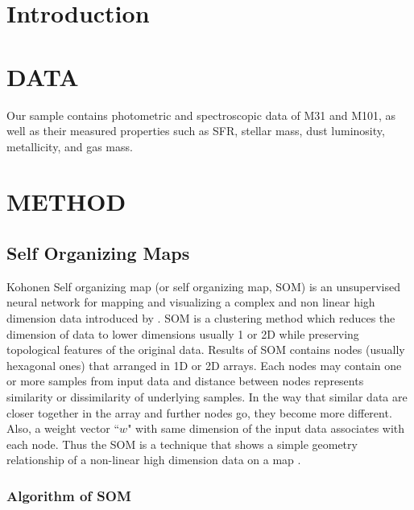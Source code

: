 \documentclass[useAMS,usenatbib]{mn2e}
\begin{document}
\section{Introduction}






\section{DATA}
Our sample contains photometric and spectroscopic data of M31 and M101, as well as their measured properties such as SFR, stellar mass, dust luminosity, metallicity, and gas mass.   



\section{METHOD}
 \subsection{Self Organizing Maps}
 
 Kohonen Self organizing map (or self organizing map, SOM) is an unsupervised neural network for mapping and visualizing a complex and non linear high dimension data introduced by \citep{Kohonen82}. 
 SOM is a clustering method which reduces the dimension of data to lower dimensions usually 1 or 2D while preserving topological features of the original data.
 Results of SOM contains nodes (usually hexagonal ones) that arranged in 1D or 2D arrays.
 Each nodes may contain one or more samples from input data and distance between nodes represents similarity or dissimilarity of underlying samples. 
 In the way that similar data are closer together in the array and further nodes go, they become more different.
 Also, a weight vector ``$w$" with same dimension of the input data associates with each node.
 Thus the SOM is a technique that shows a simple geometry relationship of a non-linear high dimension data on a map \citep{Kohonen98}. 
   \subsubsection{Algorithm of SOM} 
   
\end{document}
